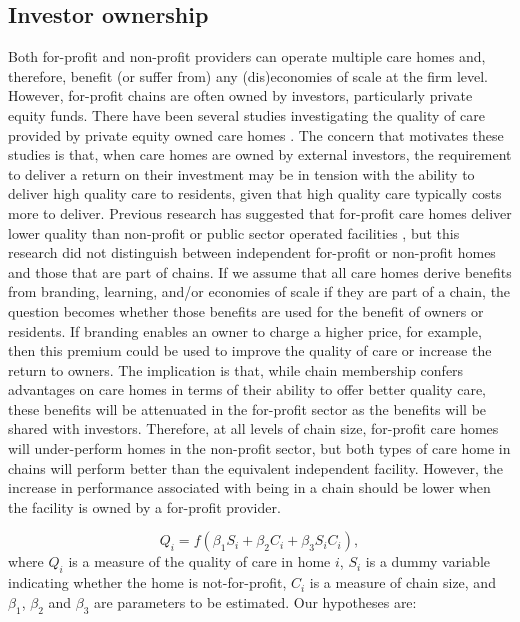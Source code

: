 \documentclass[a4paper,11pt,titlepage,british]{article}
\begin{document}
\subsection{Investor ownership}

Both for-profit and non-profit providers can operate multiple care homes and, therefore, benefit (or suffer from) any (dis)economies of scale at the firm level.  However, for-profit chains are often owned by investors, particularly private equity funds.  There have been several studies investigating the quality of care provided by private equity owned care homes \parencites{BanaszakHoll2002}{Kitchener2008}{Harrington2012}{Cadigan2015}.  The concern that motivates these studies is that, when care homes are owned by external investors, the requirement to deliver a return on their investment may be in tension with the ability to deliver high quality care to residents, given that high quality care typically costs more to deliver.  Previous research has suggested that for-profit care homes deliver lower quality than non-profit or public sector operated facilities \parencite{Barron2017}, but this research did not distinguish between independent for-profit or non-profit homes and those that are part of chains.  If we assume that all care homes derive benefits from branding, learning, and/or economies of scale if they are part of a chain, the question becomes whether those benefits are used for the benefit of owners or residents.  If branding enables an owner to charge a higher price, for example, then this premium could be used to improve the quality of care or increase the return to owners.  The implication is that, while chain membership confers advantages on care homes in terms of their ability to offer better quality care, these benefits will be attenuated in the for-profit sector as the benefits will be shared with investors.  Therefore, at all levels of chain size, for-profit care homes will under-perform homes in the non-profit sector, but both types of care home in chains will perform better than the equivalent independent facility.  However, the increase in performance associated with being in a chain should be lower when the facility is owned by a for-profit provider.

\begin{equation*}
Q_i = f(\beta_1 S_i + \beta_2 C_i + \beta_3 S_i C_i),
\end{equation*}
where $Q_i$ is a measure of the quality of care in home $i$, $S_i$ is a dummy variable indicating whether the home is not-for-profit, $C_i$ is a measure of chain size, and $\beta_1$, $\beta_2$ and $\beta_3$ are parameters to be estimated.  Our hypotheses are:
\end{document}
